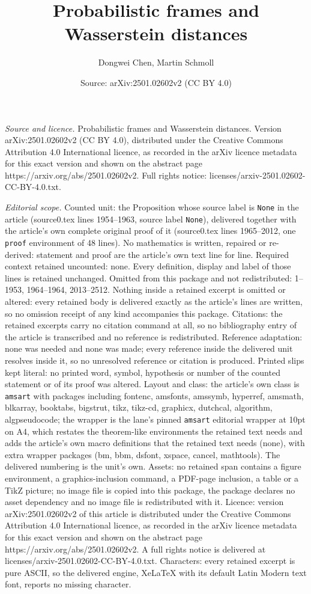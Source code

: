 \documentclass[10pt,a4paper]{amsart}
\title[Probabilistic frames and Wasserstein distances]{Probabilistic frames and Wasserstein distances}
\author{Dongwei Chen, Martin Schmoll}
\date{Source: arXiv:2501.02602v2 (CC BY 4.0)}
\begin{document}
\maketitle

\noindent\emph{Source and licence.} Probabilistic frames and Wasserstein distances. Version arXiv:2501.02602v2 (CC BY 4.0), distributed under the Creative Commons Attribution 4.0 International licence, as recorded in the arXiv licence metadata for this exact version and shown on the abstract page https://arxiv.org/abs/2501.02602v2. Full rights notice: licenses/arxiv-2501.02602-CC-BY-4.0.txt.\par\smallskip

\noindent\textit{Editorial scope.} Counted unit: the Proposition whose source label is \texttt{None} in the article (source0.tex lines 1954--1963, source label \texttt{None}), delivered together with the article's own complete original proof of it (source0.tex lines 1965--2012, one \texttt{proof} environment of 48 lines). No mathematics is written, repaired or re-derived: statement and proof are the article's own text line for line. Required context retained uncounted: none. Every definition, display and label of those lines is retained unchanged. Omitted from this package and not redistributed: 1--1953, 1964--1964, 2013--2512. Nothing inside a retained excerpt is omitted or altered: every retained body is delivered exactly as the article's lines are written, so no omission receipt of any kind accompanies this package. Citations: the retained excerpts carry no citation command at all, so no bibliography entry of the article is transcribed and no reference is redistributed. Reference adaptation: none was needed and none was made; every reference inside the delivered unit resolves inside it, so no unresolved reference or citation is produced. Printed slips kept literal: no printed word, symbol, hypothesis or number of the counted statement or of its proof was altered. Layout and class: the article's own class is \texttt{amsart} with packages including fontenc, amsfonts, amssymb, hyperref, amsmath, blkarray, booktabs, bigstrut, tikz, tikz-cd, graphicx, dutchcal, algorithm, algpseudocode; the wrapper is the lane's pinned \texttt{amsart} editorial wrapper at 10pt on A4, which restates the theorem-like environments the retained text needs and adds the article's own macro definitions that the retained text needs (none), with extra wrapper packages (bm, bbm, dsfont, xspace, cancel, mathtools). The delivered numbering is the unit's own. Assets: no retained span contains a figure environment, a graphics-inclusion command, a PDF-page inclusion, a table or a TikZ picture; no image file is copied into this package, the package declares no asset dependency and no image file is redistributed with it. Licence: version arXiv:2501.02602v2 of this article is distributed under the Creative Commons Attribution 4.0 International licence, as recorded in the arXiv licence metadata for this exact version and shown on the abstract page https://arxiv.org/abs/2501.02602v2. A full rights notice is delivered at licenses/arxiv-2501.02602-CC-BY-4.0.txt. Characters: every retained excerpt is pure ASCII, so the delivered engine, XeLaTeX with its default Latin Modern text font, reports no missing character.
\end{document}
